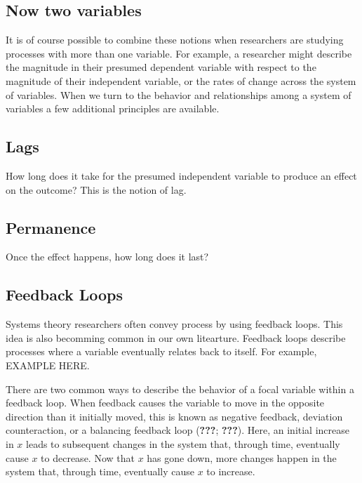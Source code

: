 \documentclass[english,,man]{apa6}
\theoremstyle{definition}
\theoremstyle{definition}
\theoremstyle{definition}
\theoremstyle{remark}
\begin{document}
\hypertarget{now-two-variables}{%
\subsection{Now two variables}\label{now-two-variables}}

It is of course possible to combine these notions when researchers are
studying processes with more than one variable. For example, a
researcher might describe the magnitude in their presumed dependent
variable with respect to the magnitude of their independent variable, or
the rates of change across the system of variables. When we turn to the
behavior and relationships among a system of variables a few additional
principles are available.

\hypertarget{lags}{%
\subsection{Lags}\label{lags}}

How long does it take for the presumed independent variable to produce
an effect on the outcome? This is the notion of lag.

\hypertarget{permanence}{%
\subsection{Permanence}\label{permanence}}

Once the effect happens, how long does it last?

\hypertarget{feedback-loops}{%
\subsection{Feedback Loops}\label{feedback-loops}}

Systems theory researchers often convey process by using feedback loops.
This idea is also becomming common in our own litearture. Feedback loops
describe processes where a variable eventually relates back to itself.
For example, EXAMPLE HERE.

There are two common ways to describe the behavior of a focal variable
within a feedback loop. When feedback causes the variable to move in the
opposite direction than it initially moved, this is known as negative
feedback, deviation counteraction, or a balancing feedback loop
({\textbf{???}}; {\textbf{???}}). Here, an initial increase in \(x\)
leads to subsequent changes in the system that, through time, eventually
cause \(x\) to decrease. Now that \(x\) has gone down, more changes
happen in the system that, through time, eventually cause \(x\) to
increase.
\end{document}
